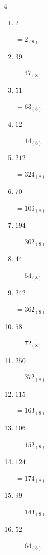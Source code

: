 \begin{multicols}{4}
\begin{enumerate}
  \item $2$

        $=2_{(8)}$

  \item $39$

        $=47_{(8)}$

  \item $51$

        $=63_{(8)}$

  \item $12$

        $=14_{(8)}$

  \item $212$

        $=324_{(8)}$

  \item $70$

        $=106_{(8)}$

  \item $194$

        $=302_{(8)}$

  \item $44$

        $=54_{(8)}$

\columnbreak %

\resetques

  \item $242$

        $=362_{(8)}$

  \item $58$

        $=72_{(8)}$

  \item $250$

        $=372_{(8)}$

  \item $115$

        $=163_{(8)}$

  \item $106$

        $=152_{(8)}$

  \item $124$

        $=174_{(8)}$

  \item $99$

        $=143_{(8)}$

  \item $52$

        $=64_{(8)}$


\end{enumerate}
\end{multicols}
